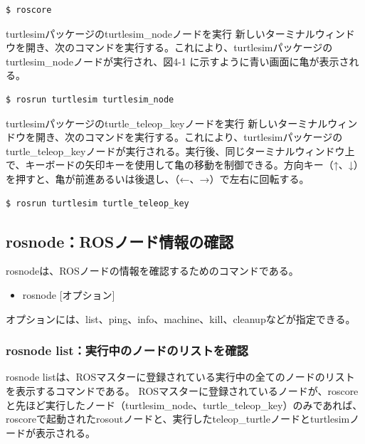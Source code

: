 \begin{lstlisting}[language=ROS]
$ roscore
\end{lstlisting}

turtlesimパッケージのturtlesim\_nodeノードを実行
新しいターミナルウィンドウを開き、次のコマンドを実行する。これにより、turtlesimパッケージのturtlesim\_nodeノードが実行され、図4-1 に示すように青い画面に亀が表示される。

\begin{lstlisting}[language=ROS]
$ rosrun turtlesim turtlesim_node
\end{lstlisting}

turtlesimパッケージのturtle\_teleop\_keyノードを実行
新しいターミナルウィンドウを開き、次のコマンドを実行する。これにより、turtlesimパッケージのturtle\_teleop\_keyノードが実行される。実行後、同じターミナルウィンドウ上で、キーボードの矢印キーを使用して亀の移動を制御できる。方向キー（↑、↓）を押すと、亀が前進あるいは後退し、（←、→）で左右に回転する。

\begin{lstlisting}[language=ROS]
$ rosrun turtlesim turtle_teleop_key
\end{lstlisting}

\subsection{rosnode：ROSノード情報の確認}

rosnodeは、ROSノードの情報を確認するためのコマンドである。

\begin{itemize}
\item  rosnode [オプション]
\end{itemize}

オプションには、list、ping、info、machine、kill、cleanupなどが指定できる。

\subsubsection{rosnode list：実行中のノードのリストを確認}

rosnode listは、ROSマスターに登録されている実行中の全てのノードのリストを表示するコマンドである。 ROSマスターに登録されているノードが、roscoreと先ほど実行したノード（turtlesim\_node、turtle\_teleop\_key）のみであれば、roscoreで起動されたrosoutノードと、実行したteleop\_turtleノードとturtlesimノードが表示される。

